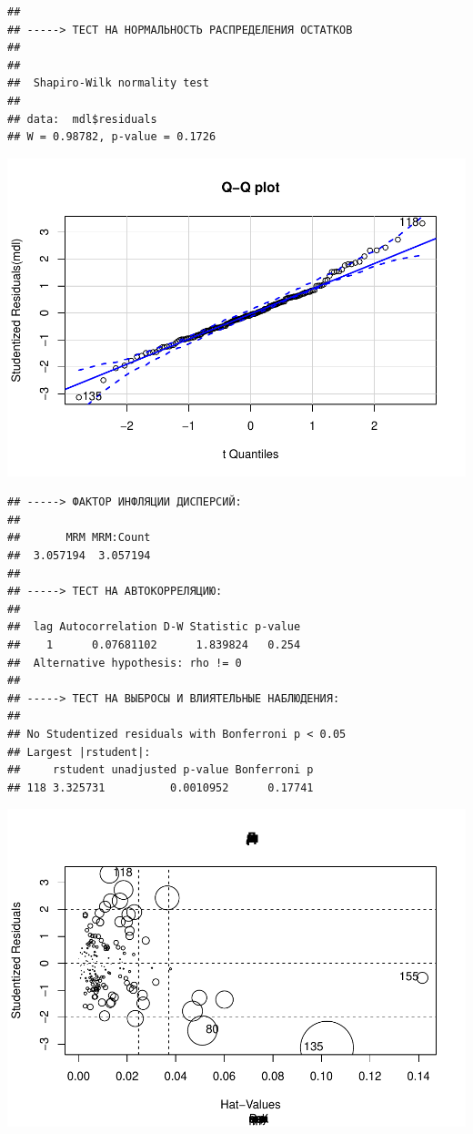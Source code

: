 \documentclass[
]{article}
\begin{document}
\begin{verbatim}
## 
## -----> ТЕСТ НА НОРМАЛЬНОСТЬ РАСПРЕДЕЛЕНИЯ ОСТАТКОВ
## 
## 
##  Shapiro-Wilk normality test
## 
## data:  mdl$residuals
## W = 0.98782, p-value = 0.1726
\end{verbatim}

\begin{center}\includegraphics[width=0.9\linewidth]{Regression-model-for-estimating-RM_files/figure-latex/unnamed-chunk-32-5} \end{center}

\begin{verbatim}
## -----> ФАКТОР ИНФЛЯЦИИ ДИСПЕРСИЙ:
## 
##       MRM MRM:Count 
##  3.057194  3.057194 
## 
## -----> ТЕСТ НА АВТОКОРРЕЛЯЦИЮ:
## 
##  lag Autocorrelation D-W Statistic p-value
##    1      0.07681102      1.839824   0.254
##  Alternative hypothesis: rho != 0
## 
## -----> ТЕСТ НА ВЫБРОСЫ И ВЛИЯТЕЛЬНЫЕ НАБЛЮДЕНИЯ:
## 
## No Studentized residuals with Bonferroni p < 0.05
## Largest |rstudent|:
##     rstudent unadjusted p-value Bonferroni p
## 118 3.325731          0.0010952      0.17741
\end{verbatim}

\begin{center}\includegraphics[width=0.9\linewidth]{Regression-model-for-estimating-RM_files/figure-latex/unnamed-chunk-32-6} \end{center}
\end{document}
